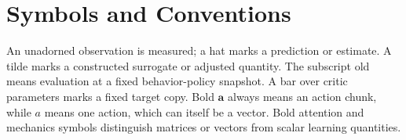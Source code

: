 \chapter*{Symbols and Conventions}
\label{front:notation}

An unadorned observation is measured; a hat marks a prediction or estimate. A tilde marks a constructed surrogate or adjusted quantity. The subscript \textnormal{old} means evaluation at a fixed behavior-policy snapshot. A bar over critic parameters marks a fixed target copy. Bold $\mathbf a$ always means an action chunk, while $a$ means one action, which can itself be a vector. Bold attention and mechanics symbols distinguish matrices or vectors from scalar learning quantities.

